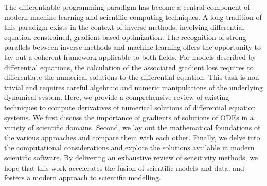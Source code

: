 The differentiable programming paradigm has become a central component of modern machine learning and scientific computing techniques. 
A long tradition of this paradigm exists in the context of inverse methods, involving differential equation-constrained, gradient-based optimization.
The recognition of strong parallels between inverse methods and machine learning offers the opportunity to lay out a coherent framework applicable to both fields.
For models described by differential equations, the calculation of the associated gradient loss requires to differentiate the numerical solutions to the differential equation. This task is non-trivial and requires careful algebraic and numeric manipulations of the underlying dynamical system.
Here, we provide a comprehensive review of existing techniques to compute derivatives of numerical solutions of differential equation systems.
We first discuss the importance of gradients of solutions of ODEs in a variety of scientific domains.
Second, we lay out the mathematical foundations of the various approaches and compare them with each other. 
Finally, we delve into the computational considerations and explore the solutions available in modern scientific software. 
By delivering an exhaustive review of sensitivity methods, we hope that this work accelerates the fusion of scientific models and data, and fosters a modern approach to scientific modelling.